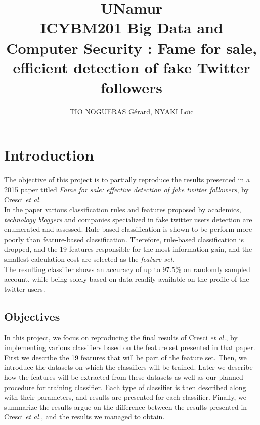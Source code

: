 \documentclass[a4paper,11pt]{article}
\title{UNamur\\
	ICYBM201 Big Data and Computer Security : Fame for sale, efficient detection of fake Twitter
followers}
\author{TIO NOGUERAS Gérard, NYAKI Loïc}
\begin{document}
\maketitle

\newpage
\tableofcontents
\newpage

\section{Introduction}
\paragraph{}
The objective of this project is to partially reproduce the results presented in a 2015 paper titled  \textit{Fame for sale: effective detection of fake twitter followers}, by Cresci \textit{et al.}\\

In the paper various classification rules and features proposed by academics, \textit{technology bloggers} and companies specialized in fake twitter users detection are enumerated and assessed. Rule-based classification is shown to be perform more poorly than feature-based classification. Therefore, rule-based classification is dropped, and the 19 features responsible for the most information gain, and the smallest calculation cost are selected as the \textit{feature set}.\\

The resulting classifier shows an accuracy of up to 97.5\% on randomly sampled account, while being solely based on data readily available on the profile of the twitter users.

\subsection{Objectives}
In this project, we focus on reproducing the final results of Cresci \textit{et al.}, by implementing various classifiers based on the feature set presented in that paper.\\

First we describe the 19 features that will be part of the feature set. Then, we introduce the datasets on which the classifiers will be trained. Later we describe how the features will be extracted from these datasets as well as our planned procedure for training classifier. Each type of classifier is then described along with their parameters, and results are presented for each classifier. Finally, we summarize the results argue on the difference between the results presented in Cresci \textit{et al.}, and the results we managed to obtain.
\end{document}
